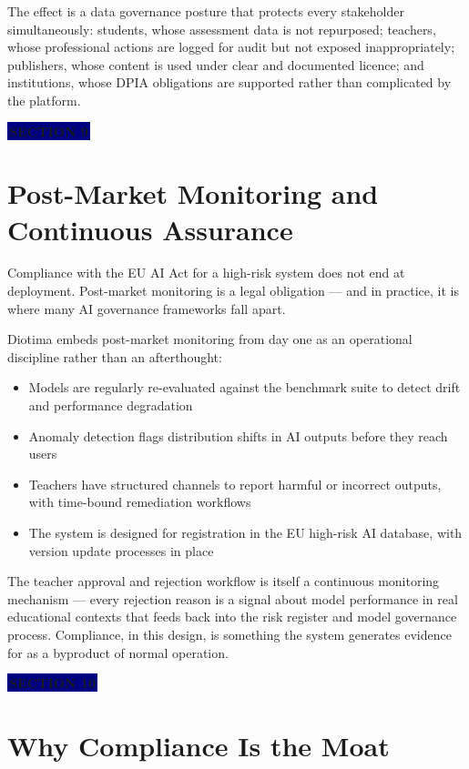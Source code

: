 \documentclass[11pt, a4paper]{article}
\newcommand{\sectiontag}[1]{%
  \vspace{4pt}%
  {\color{white}\colorbox{navy}{\small\bfseries\,#1\,}}%
  \vspace{6pt}%
}
\begin{document}
The effect is a data governance posture that protects every stakeholder simultaneously: students, whose assessment data is not repurposed; teachers, whose professional actions are logged for audit but not exposed inappropriately; publishers, whose content is used under clear and documented licence; and institutions, whose DPIA obligations are supported rather than complicated by the platform.

\sectiontag{SECTION 9}

\section{Post-Market Monitoring and Continuous Assurance}

Compliance with the EU AI Act for a high-risk system does not end at deployment. Post-market monitoring is a legal obligation --- and in practice, it is where many AI governance frameworks fall apart.

Diotima embeds post-market monitoring from day one as an operational discipline rather than an afterthought:

\begin{itemize}
  \item Models are regularly re-evaluated against the benchmark suite to detect drift and performance degradation
  \item Anomaly detection flags distribution shifts in AI outputs before they reach users
  \item Teachers have structured channels to report harmful or incorrect outputs, with time-bound remediation workflows
  \item The system is designed for registration in the EU high-risk AI database, with version update processes in place
\end{itemize}

The teacher approval and rejection workflow is itself a continuous monitoring mechanism --- every rejection reason is a signal about model performance in real educational contexts that feeds back into the risk register and model governance process. Compliance, in this design, is something the system generates evidence for as a byproduct of normal operation.

\sectiontag{SECTION 10}

\section{Why Compliance Is the Moat}
\end{document}

